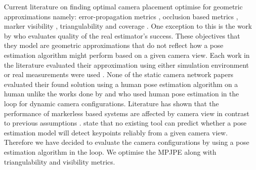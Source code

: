Current literature on finding optimal camera placement optimise for geometric approximations namely: error-propagation metrics \cite{olague2002optimal}, occlusion based metrics \cite{chen2008occlusion, rahimian2016optimal, aissaoui2018designing}, marker visibility \cite{chen2008occlusion, aissaoui2018designing, rahimian2016optimal}, triangulability \cite{rahimian2016optimal, olague2002optimal} and coverage \cite{horster2006optimal, gonzalez2009optimal, zhao2013approximate}. One exception to this is the work by \citet{jorgensen2018simulation} who evaluates quality of the real estimator's success. These objectives that they model are geometric approximations that do not reflect how a pose estimation algorithm might perform based on a given camera view.
Each work in the literature evaluated their approximation using either simulation environment \cite{olague2002optimal, aissaoui2018designing, zhao2013approximate, gonzalez2009optimal, horster2006optimal} or real measurements were used \cite{chen2008occlusion, rahimian2016optimal, jorgensen2018simulation, bodor2007optimal}. None of the static camera network papers evaluated their found solution using a human pose estimation algorithm on a human unlike the works done by \citet{kiciroglu2020activemocap} and \citet{ci2023proactive} who used human pose estimation in the loop for dynamic camera configurations.
Literature has shown that the performance of markerless based systems are affected by camera view in contrast to previous assumptions \cite{zhao2026influence, baldinger2025influence, samani2026optimizing}. \citet{samani2026optimizing} state that no existing tool can predict whether a pose estimation model will detect keypoints reliably from a given camera view.
Therefore we have decided to evaluate the camera configurations by using a pose estimation algorithm in the loop. We optimise the MPJPE along with triangulability and visibility metrics.

